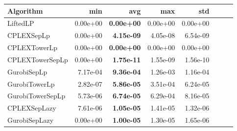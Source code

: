 \begin{tabular}{lrrrrrrr}
Algorithm & min & avg & max & std
\\
\hline
LiftedLP&0.00e+00& \bf0.00e+00& 0.00e+00& 0.00e+00\\
CPLEXSepLp&0.00e+00& \bf4.15e-09& 4.05e-08& 6.54e-09\\
CPLEXTowerLp&0.00e+00& \bf0.00e+00& 0.00e+00& 0.00e+00\\
CPLEXTowerSepLp&0.00e+00& \bf1.75e-11& 1.55e-09& 1.56e-10\\
GurobiSepLp&7.17e-04& \bf9.36e-04& 1.26e-03& 1.16e-04\\
GurobiTowerLp&2.82e-07& \bf5.86e-05& 3.51e-04& 6.24e-05\\
GurobiTowerSepLp&5.73e-06& \bf6.74e-05& 6.29e-04& 8.16e-05\\
CPLEXSepLazy&7.61e-06& \bf1.05e-05& 1.41e-05& 1.32e-06\\
GurobiSepLazy&0.00e+00& \bf1.00e-05& 1.30e-05& 1.65e-06
\end{tabular}

